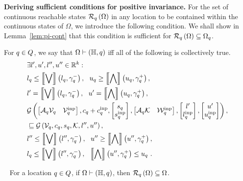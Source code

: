 %
{\bf Deriving sufficient conditions for positive invariance.}  For the
set of continuous reachable states $\mathcal{R}_{q}\left(\Omega\right)$ in any
location to be contained within the continuous states of $\Omega$, we
introduce the following condition.  We shall show in
Lemma~\ref{lem:pi-cont} that this
condition is sufficient for
$\mathcal{R}_{q}\left(\Omega\right)\subseteq\Omega_q$.
%
\begin{definition}
  For $q\in Q$, we say that
  $\Omega\vdash\left(\mathbb{H},q\right)$ iff  all of the following is
  collectively true.
%
\begin{align}
& \exists l^\prime,u^\prime,l^{\prime\prime},u^{\prime\prime}\in\mathbb{R}^k:\nonumber\\
& l_q\leq\left\llbracket\bigvee\right\rrbracket\left(l_q,\gamma_q^-\right),~~u_q\geq\left\llbracket\bigwedge\right\rrbracket\left(u_q,\gamma_q^+\right),~\label{eqn:continv1}\\
& l^\prime= \left\llbracket\bigvee\right\rrbracket\left(l_q,\gamma_q^-\right),~~u^\prime= \left\llbracket\bigwedge\right\rrbracket\left(u_q,\gamma_q^+\right),~\label{eqn:continv2}\\
& \mathcal{G}\left(
\left[\begin{matrix}\mathcal{A}_q\mathcal{V}_q & \mathcal{V}^{\operatorname{inp}}_q\end{matrix}\right]
,
c_q+c^{\operatorname{inp}}_q
,
\left[\begin{matrix}s_q\\ s^{\operatorname{inp}}_q\end{matrix}\right]
,
\left[\begin{matrix}\mathcal{A}_q\mathcal{K} & \mathcal{W}^{\operatorname{inp}}_q\end{matrix}\right]
,
\left[\begin{matrix}l^\prime\\l^{\operatorname{inp}}_q\end{matrix}\right]
,
\left[\begin{matrix}u^\prime\\ u^{\operatorname{inp}}_q\end{matrix}\right]
\right),\nonumber\\
& \sqsubseteq 
\mathcal{G}\left(\mathcal{V}_q,c_q,s_q,\mathcal{K},l^{\prime\prime},u^{\prime\prime}\right),~\label{eqn:continv3}\\
&
l^{\prime\prime}\leq\left\llbracket\bigvee\right\rrbracket\left(l^{\prime\prime},\gamma_q^-\right),~~u^{\prime\prime}\geq\left\llbracket\bigwedge\right\rrbracket\left(u^{\prime\prime},\gamma_q^+\right),~\label{eqn:continv4}\\
& l_q\leq\left\llbracket\bigvee\right\rrbracket\left(l^{\prime\prime},\gamma_q^-\right),~~\left\llbracket\bigwedge\right\rrbracket\left(u^{\prime\prime},\gamma_q^+\right)\leq u_q~\label{eqn:continv5}.
\end{align}
%
\end{definition}
%
\begin{lemma}~\label{lem:pi-cont}
For a location $q\in Q$, if $\Omega\vdash\left(\mathbb{H},q\right)$, then
$\mathcal{R}_{q}\left(\Omega\right)\subseteq\Omega$.
\end{lemma}
%
